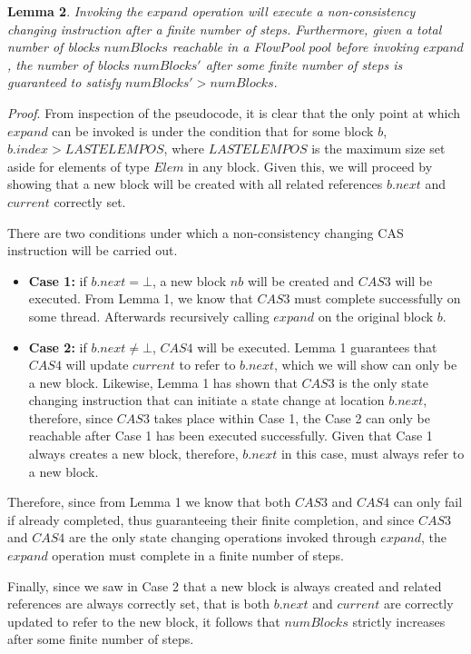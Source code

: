 \documentclass[runningheads,a4paper]{llncs}
\begin{document}
\textbf{Lemma 2}. \textit{Invoking the $expand$ operation will execute a  
non-consistency changing instruction after a finite number of steps. Furthermore,
given a total number of blocks $numBlocks$ reachable in a FlowPool $pool$
before invoking $expand$, the number of blocks $numBlocks'$ after some finite
number of steps is guaranteed to satisfy $numBlocks'>numBlocks$}.

\textit{Proof}. From inspection of the pseudocode, it is clear that the only
point at which $expand$ can be invoked is under the condition that for some
block $b$, $b.index > LASTELEMPOS$, where $LASTELEMPOS$ is the maximum size
set aside for elements of type $Elem$ in any block. Given this, we will proceed 
by showing that a new block will be created with all related references 
$b.next$ and $current$ correctly set.

There are two conditions under which a non-consistency changing CAS
instruction will be carried out. 

\begin{itemize} 
\item \textbf{Case 1:} if $b.next=\bot$, a new block $nb$ will
be created and $CAS3$ will be executed. From Lemma 1, we know that $CAS3$
must complete successfully on some thread. Afterwards recursively calling 
$expand$ on the original block $b$.
\item \textbf{Case 2:} if $b.next\neq\bot$, $CAS4$ will be executed. 
Lemma 1 guarantees that $CAS4$ will update $current$ to refer to $b.next$, 
which we will show can only be a new block. Likewise, Lemma 1 has shown that 
$CAS3$ is the only state changing instruction that can initiate a state change 
at location $b.next$, therefore, since $CAS3$ takes place within Case 1, the 
Case 2 can only be reachable after Case 1 has been executed successfully. Given 
that Case 1 always creates a new block, therefore, $b.next$ in this case, must 
always refer to a new block.
\end{itemize}

Therefore, since from Lemma 1 we know that both $CAS3$ and $CAS4$ can only fail 
if already completed, thus guaranteeing their finite completion, and since 
$CAS3$ and $CAS4$ are the only state changing operations invoked through 
$expand$, the $expand$ operation must complete in a finite number of steps.

Finally, since we saw in Case 2 that a new block is always created and related
references are always correctly set, that is both $b.next $ and $current$ are
correctly updated to refer to the new block, it follows that $numBlocks$
strictly increases after some finite number of steps.
\end{document}
